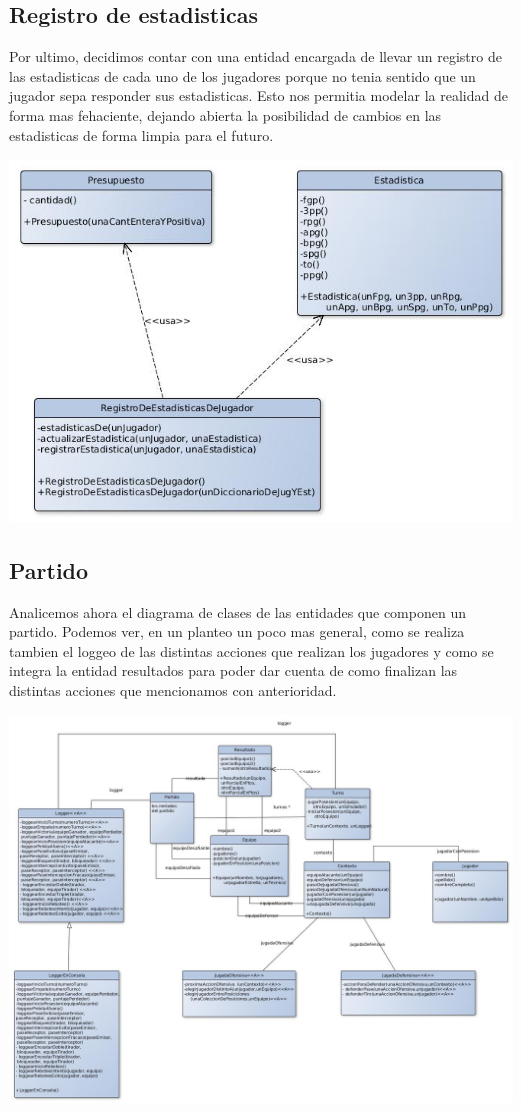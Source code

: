 \subsection{Registro de estadisticas}
Por ultimo, decidimos contar con una entidad encargada de llevar un registro de las estadisticas de cada uno de los jugadores porque no tenia sentido que un jugador sepa responder sus estadisticas. Esto nos permitia modelar la realidad de forma mas fehaciente, dejando abierta la posibilidad de cambios en las estadisticas de forma limpia para el futuro.
\begin{center}
\includegraphics[scale=0.4]{diseno/registroDeEstadisticas.jpg}
\end{center}

\subsection{Partido}
Analicemos ahora el diagrama de clases de las entidades que componen un partido. Podemos ver, en un planteo un poco mas general, como se realiza tambien el loggeo de las distintas acciones que realizan los jugadores y como se integra la entidad resultados para poder dar cuenta de como finalizan las distintas acciones que mencionamos con anterioridad.
\begin{center}
\includegraphics[scale=0.4, angle=90]{diseno/partido.jpg}
\end{center}


